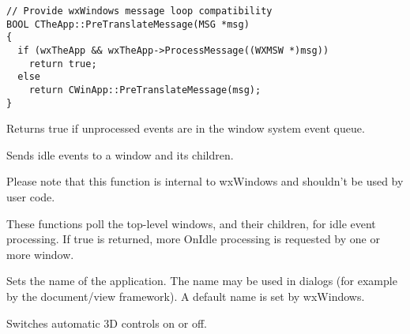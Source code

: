 \begin{verbatim}
// Provide wxWindows message loop compatibility
BOOL CTheApp::PreTranslateMessage(MSG *msg)
{
  if (wxTheApp && wxTheApp->ProcessMessage((WXMSW *)msg))
    return true;
  else
    return CWinApp::PreTranslateMessage(msg);
}
\end{verbatim}


\label{wxapppending}


Returns true if unprocessed events are in the window system event queue.




\label{wxappsendidleevents}


Sends idle events to a window and its children.

Please note that this function is internal to wxWindows and shouldn't be used
by user code.


These functions poll the top-level windows, and their children, for idle event processing.
If true is returned, more OnIdle processing is requested by one or more window.




\label{wxappsetappname}


Sets the name of the application. The name may be used in dialogs
(for example by the document/view framework). A default name is set by
wxWindows.




\label{wxappsetauto3d}


Switches automatic 3D controls on or off.



